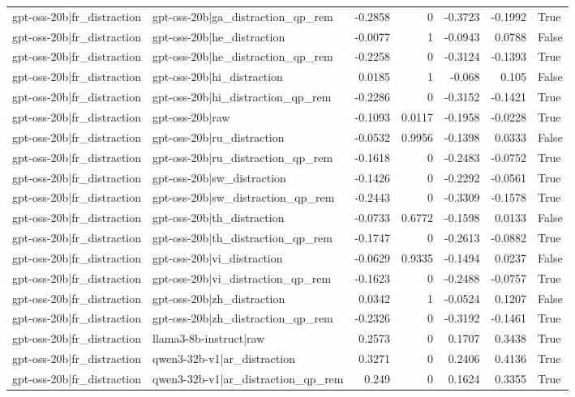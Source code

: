 \begin{table}
\begin{tabular}{l l r r r r l}
gpt-oss-20b|fr_distraction & gpt-oss-20b|ga_distraction_qp_rem & -0.2858 & 0 & -0.3723 & -0.1992 & True \\
gpt-oss-20b|fr_distraction & gpt-oss-20b|he_distraction & -0.0077 & 1 & -0.0943 & 0.0788 & False \\
gpt-oss-20b|fr_distraction & gpt-oss-20b|he_distraction_qp_rem & -0.2258 & 0 & -0.3124 & -0.1393 & True \\
gpt-oss-20b|fr_distraction & gpt-oss-20b|hi_distraction & 0.0185 & 1 & -0.068 & 0.105 & False \\
gpt-oss-20b|fr_distraction & gpt-oss-20b|hi_distraction_qp_rem & -0.2286 & 0 & -0.3152 & -0.1421 & True \\
gpt-oss-20b|fr_distraction & gpt-oss-20b|raw & -0.1093 & 0.0117 & -0.1958 & -0.0228 & True \\
gpt-oss-20b|fr_distraction & gpt-oss-20b|ru_distraction & -0.0532 & 0.9956 & -0.1398 & 0.0333 & False \\
gpt-oss-20b|fr_distraction & gpt-oss-20b|ru_distraction_qp_rem & -0.1618 & 0 & -0.2483 & -0.0752 & True \\
gpt-oss-20b|fr_distraction & gpt-oss-20b|sw_distraction & -0.1426 & 0 & -0.2292 & -0.0561 & True \\
gpt-oss-20b|fr_distraction & gpt-oss-20b|sw_distraction_qp_rem & -0.2443 & 0 & -0.3309 & -0.1578 & True \\
gpt-oss-20b|fr_distraction & gpt-oss-20b|th_distraction & -0.0733 & 0.6772 & -0.1598 & 0.0133 & False \\
gpt-oss-20b|fr_distraction & gpt-oss-20b|th_distraction_qp_rem & -0.1747 & 0 & -0.2613 & -0.0882 & True \\
gpt-oss-20b|fr_distraction & gpt-oss-20b|vi_distraction & -0.0629 & 0.9335 & -0.1494 & 0.0237 & False \\
gpt-oss-20b|fr_distraction & gpt-oss-20b|vi_distraction_qp_rem & -0.1623 & 0 & -0.2488 & -0.0757 & True \\
gpt-oss-20b|fr_distraction & gpt-oss-20b|zh_distraction & 0.0342 & 1 & -0.0524 & 0.1207 & False \\
gpt-oss-20b|fr_distraction & gpt-oss-20b|zh_distraction_qp_rem & -0.2326 & 0 & -0.3192 & -0.1461 & True \\
gpt-oss-20b|fr_distraction & llama3-8b-instruct|raw & 0.2573 & 0 & 0.1707 & 0.3438 & True \\
gpt-oss-20b|fr_distraction & qwen3-32b-v1|ar_distraction & 0.3271 & 0 & 0.2406 & 0.4136 & True \\
gpt-oss-20b|fr_distraction & qwen3-32b-v1|ar_distraction_qp_rem & 0.249 & 0 & 0.1624 & 0.3355 & True \\

\end{tabular}
\end{table}
